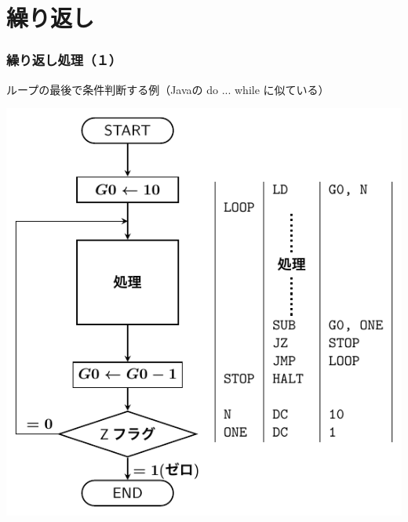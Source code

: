 \documentclass[handout]{beamer}        %
\begin{document}
\section{繰り返し}
\begin{frame}
  \frametitle{繰り返し処理（１）}
  ループの最後で条件判断する例（Javaの do ... while に似ている）\\
  \vfill
  \centerline{\includegraphics[scale=0.7]{../Tikz/flow2.pdf}}
  \vfill
\end{frame}
\end{document}
